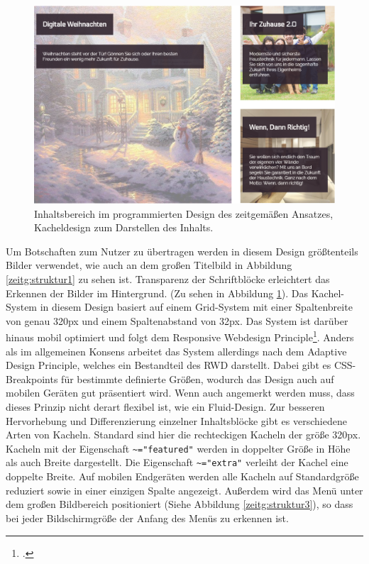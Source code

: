\begin{figure} [hp]
	\includegraphics[width=\textwidth]{./img/zeitg_struktur2.png}
	\caption{Inhaltsbereich im programmierten Design des zeitgemäßen Ansatzes, Kacheldesign zum Darstellen des Inhalts.}
	\label{zeitg:struktur2}
\end{figure}

Um Botschaften zum Nutzer zu übertragen werden in diesem Design größtenteils Bilder verwendet, wie auch an dem großen Titelbild in Abbildung \ref{zeitg:struktur1} zu sehen ist. Transparenz der Schriftblöcke erleichtert das Erkennen der Bilder im Hintergrund. (Zu sehen in Abbildung \ref{zeitg:struktur2}).
Das Kachel-System in diesem Design basiert auf einem Grid-System mit einer Spaltenbreite von genau 320px und einem Spaltenabstand von 32px. Das System ist darüber hinaus mobil optimiert und folgt dem Responsive Webdesign Principle\footcite[vgl.][]{alistapart:rwd}. Anders als im allgemeinen Konsens arbeitet das System allerdings nach dem Adaptive Design Principle, welches ein Bestandteil des RWD darstellt. Dabei gibt es CSS-Breakpoints für bestimmte definierte Größen, wodurch das Design auch auf mobilen Geräten gut präsentiert wird. Wenn auch angemerkt werden muss, dass dieses Prinzip nicht derart flexibel ist, wie ein Fluid-Design.
Zur besseren Hervorhebung und Differenzierung einzelner Inhaltsblöcke gibt es verschiedene Arten von Kacheln. Standard sind hier die rechteckigen Kacheln der größe 320px. Kacheln mit der Eigenschaft \lstinline{~="featured"} werden in doppelter Größe in Höhe als auch Breite dargestellt. Die Eigenschaft \lstinline{~="extra"} verleiht der Kachel eine doppelte Breite.
Auf mobilen Endgeräten werden alle Kacheln auf Standardgröße reduziert sowie in einer einzigen Spalte angezeigt. Außerdem wird das Menü unter dem großen Bildbereich positioniert (Siehe Abbildung \ref{zeitg:struktur3}), so dass bei jeder Bildschirmgröße der Anfang des Menüs zu erkennen ist.

